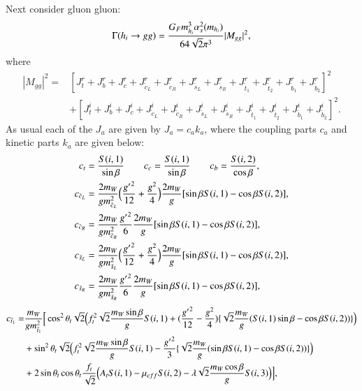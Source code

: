 \documentclass[final,3p,times]{elsarticle}
\begin{document}
Next consider gluon gluon:
\begin{equation} \label{hggNMSSM}
\Gamma(h_{i} \rightarrow gg) = {G_{F} m_{h_i}^3 \alpha_{s}^2 (m_{h_i}) \over 64 \sqrt{2} \pi^3} |M_{gg}|^2,
\end{equation}
where
\begin{equation}
\begin{aligned}
|M_{gg}|^2 = & [J_{t}^{r} + J_{b}^{r} + J_{c}^{r} + J_{\tilde{c}_L}^{r} + J_{\tilde{c}_R}^{r} + J_{\tilde{s}_L}^{r} + J_{\tilde{s}_R}^{r} + J_{\tilde{t}_1}^{r} + J_{\tilde{t}_2}^{r} + J_{\tilde{b}_1}^{r} + J_{\tilde{b}_2}^{r}]^2 \\ & + [J_{t}^{i} + J_{b}^{i} + J_{c}^{i} + J_{\tilde{c}_L}^{i} + J_{\tilde{c}_R}^{i} + J_{\tilde{s}_L}^{i} + J_{\tilde{s}_R}^{i} + J_{\tilde{t}_1}^{i} + J_{\tilde{t}_2}^{i} + J_{\tilde{b}_1}^{i} + J_{\tilde{b}_2}^{i}]^2.
\end{aligned}
\end{equation}
As usual each of the $J_a$ are given by $J_{a} = c_{a}k_{a}$, where the coupling parts $c_{a}$ and kinetic parts $k_{a}$ are given below:
\begin{align}
c_{t} &= {S(i,1) \over \sin\beta} \quad \quad c_{c} = {S(i,1) \over \sin\beta} \quad \quad c_{b} = {S(i,2) \over \cos\beta}, \\
c_{\tilde{c}_L} &= {2 m_{W} \over g m_{\tilde{c}_L}^2}\Big({{g'}^2 \over 12} + {g^2 \over 4}\Big){2 m_{W} \over g}[\sin\beta S(i,1) - \cos\beta S(i,2)], \\
c_{\tilde{c}_R} &= {2 m_{W} \over g m_{\tilde{c}_R}^2}{{g'}^2 \over 6}{2 m_{W} \over g}[\sin\beta S(i,1) - \cos\beta S(i,2)], \\
c_{\tilde{s}_L} &= {2 m_{W} \over g m_{\tilde{s}_L}^2}\Big({{g'}^2 \over 12} + {g^2 \over 4}\Big){2 m_{W} \over g}[\sin\beta S(i,1) - \cos\beta S(i,2)], \\
c_{\tilde{s}_R} &= {2 m_{W} \over g m_{\tilde{s}_R}^2}{{g'}^2 \over 6}{2 m_{W} \over g}[\sin\beta S(i,1) - \cos\beta S(i,2)], \\
\end{align}
\begin{equation}
\begin{aligned}
c_{\tilde{t}_1} = & {m_{W} \over g m_{\tilde{t}_1}^2}\Big[\cos^2 \theta_t \sqrt{2}\Big(f_{t}^2\sqrt{2} {m_{W} \sin\beta \over g}S(i,1) + ({{g'}^2 \over 12} - {g^2 \over 4})\{\sqrt{2} {m_{W} \over g}(S(i,1)\sin\beta - \cos\beta S(i,2))\}\Big) \\ & + \sin^2 \theta_t \sqrt{2} \Big(f_{t}^2 \sqrt{2} {m_{W} \sin\beta \over g}S(i,1) - {{g'}^2 \over 3}\{\sqrt{2} {m_{W} \over g}(\sin\beta S(i,1) - \cos\beta S(i,2))\}\Big) \\ & + 2\sin\theta_t \cos\theta_t {f_{t} \over \sqrt{2}}\Big(A_{t}S(i,1) - \mu_{eff}S(i,2) - \lambda\sqrt{2}{m_{W} \cos\beta \over g}S(i,3)\Big)\Big],
\end{aligned}
\end{equation}
\end{document}

